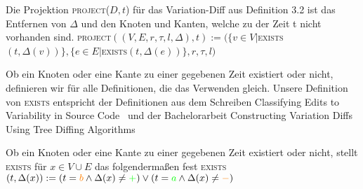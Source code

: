 \begin{definition}
	Die Projektion \textsc{project}($D,t$) für das Variation-Diff aus Definition 3.2 ist das Entfernen von $\Delta$ und den Knoten und Kanten, welche zu der Zeit t nicht vorhanden sind. \textsc{project}$((V,E,r,\tau,l,\Delta),t) := (\{v \in V | $\textsc{exists}$(t,\Delta(v))\},\{e \in E | $\textsc{exists}$(t,\Delta(e))\},r,\tau,l)$
\end{definition}
Ob ein Knoten oder eine Kante zu einer gegebenen Zeit existiert oder nicht, definieren wir für alle Definitionen, die das Verwenden gleich. Unsere Definition von \textsc{exists} entspricht der Definitionen aus dem Schreiben Classifying Edits to Variability in Source Code~\cite{BTS+:ESECFSE22} und der Bachelorarbeit Constructing Variation Diffs Using Tree Diffing Algorithms~\cite{Moosherr23}
\begin{definition}
	Ob ein Knoten oder eine Kante zu einer gegebenen Zeit existiert oder nicht, stellt \textsc{exists}  für $x \in V \cup E$ das folgendermaßen fest \textsc{exists}$(t,\Delta(x)) := (t = \textcolor{orange}{b} \land \Delta(x) \neq \textcolor{green}{+}) \lor (t = \textcolor{green}{a} \land \Delta(x) \neq \textcolor{orange}{-})$
\end{definition}

